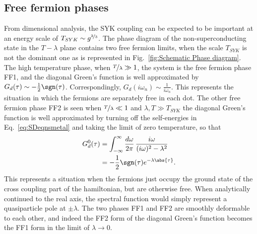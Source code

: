 \subsection{Free fermion phases}
From dimensional analysis, the SYK coupling can be expected to be important at an energy scale of $T_{SYK} \sim g^{\nicefrac{2}{3}}$. 
The phase diagram of the non-superconducting state in the $T-\lambda$ plane contains two free fermion limits, when the scale $T_{SYK}$ is not the dominant one as is represented in Fig.~\ref{fig:Schematic Phase diagram}. 
%
The high temperature phase, when $\nicefrac{T}{\lambda} \gg 1 $, the system is the free fermion phase FF1, and the diagonal Green's function is well approximated by $G_{d}(\tau)\sim -\frac{1}{2}\sgn(\tau)$. Correspondingly, $G_{d}(i\omega_n) \sim \frac{1}{i\omega_n} $. This represents the situation in which the fermions are separately free in each dot.
%
The other free fermion phase FF2 is seen when $\nicefrac{T}{\lambda}\ll 1$ and $\lambda, T \gg T_{SYK}$ the diagonal Green's function is well approximated by turning off the self-energies in Eq.~\eqref{eq:SDeqnsmetal} and taking the limit of zero temperature, so that 
\begin{align}
    G_d^0(\tau) &= \int_{-\infty}^{\infty} \frac{d\omega}{2\pi}\, \frac{i\omega}{(i\omega)^2 - \lambda^2} \nonumber \\
    &= -\frac{1}{2}\sgn(\tau) e^{-\lambda\abs{\tau}}.
    \label{eq:Gd0taulambda}
\end{align}
This represents a situation when the fermions just occupy the ground state of the cross coupling part of the hamiltonian, but are otherwise free. When analytically continued to the real axis, the spectral function would simply represent a quasiparticle pole at $\pm\lambda$.
%
The two phases FF1 and FF2 are smoothly deformable to each other, and indeed the FF2 form of the diagonal Green's function becomes the FF1 form in the limit of $\lambda\rightarrow 0$.
%
